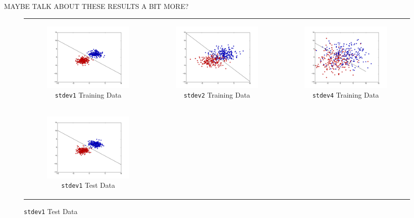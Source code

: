 \documentclass{sigchi}
\begin{document}
MAYBE TALK ABOUT THESE RESULTS A BIT MORE?

\begin{figure}[!ht]
\centering
\begin{tabular}{c c c}
\begin{subfigure}[b]{2.25in}
	\includegraphics[width = 2.25in]{plots/stdev1_train_plot.png}
	\caption{\texttt{stdev1} Training Data}
\end{subfigure} &

\begin{subfigure}[b]{2.25in}
	\includegraphics[width = 2.25in]{plots/stdev2_train_plot.png}
	\caption{\texttt{stdev2} Training Data}
\end{subfigure} &

\begin{subfigure}[b]{2.25in}
	\includegraphics[width = 2.25in]{plots/stdev4_train_plot.png}
	\caption{\texttt{stdev4} Training Data}
\end{subfigure} \\

\begin{subfigure}[b]{2.25in}
	\includegraphics[width = 2.25in]{plots/stdev1_test_plot.png}
	\caption{\texttt{stdev1} Test Data}
\end{subfigure} &


\end{tabular}
\end{figure}
\end{document}
